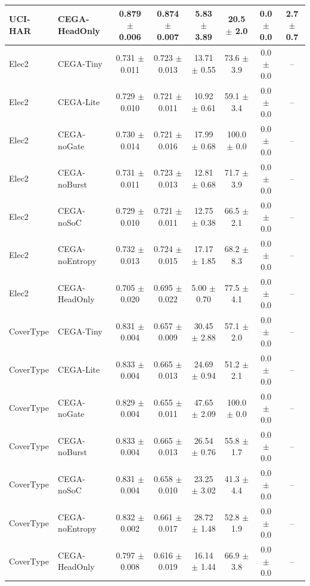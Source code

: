\begin{table}[t]
{\begin{tabular}{llcccccc}
UCI-HAR & CEGA-HeadOnly & 0.879 $\pm$ 0.006 & 0.874 $\pm$ 0.007 & 5.83 $\pm$ 3.89 & 20.5 $\pm$ 2.0 & 0.0 $\pm$ 0.0 & 2.7 $\pm$ 0.7 \\
\midrule
Elec2 & CEGA-Tiny & 0.731 $\pm$ 0.011 & 0.723 $\pm$ 0.013 & 13.71 $\pm$ 0.55 & 73.6 $\pm$ 3.9 & 0.0 $\pm$ 0.0 & -- \\
Elec2 & CEGA-Lite & 0.729 $\pm$ 0.010 & 0.721 $\pm$ 0.011 & 10.92 $\pm$ 0.61 & 59.1 $\pm$ 3.4 & 0.0 $\pm$ 0.0 & -- \\
Elec2 & CEGA-noGate & 0.730 $\pm$ 0.014 & 0.721 $\pm$ 0.016 & 17.99 $\pm$ 0.68 & 100.0 $\pm$ 0.0 & 0.0 $\pm$ 0.0 & -- \\
Elec2 & CEGA-noBurst & 0.731 $\pm$ 0.011 & 0.723 $\pm$ 0.013 & 12.81 $\pm$ 0.68 & 71.7 $\pm$ 3.9 & 0.0 $\pm$ 0.0 & -- \\
Elec2 & CEGA-noSoC & 0.729 $\pm$ 0.010 & 0.721 $\pm$ 0.011 & 12.75 $\pm$ 0.38 & 66.5 $\pm$ 2.1 & 0.0 $\pm$ 0.0 & -- \\
Elec2 & CEGA-noEntropy & 0.732 $\pm$ 0.013 & 0.724 $\pm$ 0.015 & 17.17 $\pm$ 1.85 & 68.2 $\pm$ 8.3 & 0.0 $\pm$ 0.0 & -- \\
Elec2 & CEGA-HeadOnly & 0.705 $\pm$ 0.020 & 0.695 $\pm$ 0.022 & 5.00 $\pm$ 0.70 & 77.5 $\pm$ 4.1 & 0.0 $\pm$ 0.0 & -- \\
\midrule
CoverType & CEGA-Tiny & 0.831 $\pm$ 0.004 & 0.657 $\pm$ 0.009 & 30.45 $\pm$ 2.88 & 57.1 $\pm$ 2.0 & 0.0 $\pm$ 0.0 & -- \\
CoverType & CEGA-Lite & 0.833 $\pm$ 0.004 & 0.665 $\pm$ 0.013 & 24.69 $\pm$ 0.94 & 51.2 $\pm$ 2.1 & 0.0 $\pm$ 0.0 & -- \\
CoverType & CEGA-noGate & 0.829 $\pm$ 0.004 & 0.655 $\pm$ 0.011 & 47.65 $\pm$ 2.09 & 100.0 $\pm$ 0.0 & 0.0 $\pm$ 0.0 & -- \\
CoverType & CEGA-noBurst & 0.833 $\pm$ 0.004 & 0.665 $\pm$ 0.013 & 26.54 $\pm$ 0.76 & 55.8 $\pm$ 1.7 & 0.0 $\pm$ 0.0 & -- \\
CoverType & CEGA-noSoC & 0.831 $\pm$ 0.004 & 0.658 $\pm$ 0.010 & 23.25 $\pm$ 3.02 & 41.3 $\pm$ 4.4 & 0.0 $\pm$ 0.0 & -- \\
CoverType & CEGA-noEntropy & 0.832 $\pm$ 0.002 & 0.661 $\pm$ 0.017 & 28.72 $\pm$ 1.48 & 52.8 $\pm$ 1.9 & 0.0 $\pm$ 0.0 & -- \\
CoverType & CEGA-HeadOnly & 0.797 $\pm$ 0.008 & 0.616 $\pm$ 0.019 & 16.14 $\pm$ 1.44 & 66.9 $\pm$ 3.8 & 0.0 $\pm$ 0.0 & -- \\
\bottomrule
\end{tabular}}
\end{table}